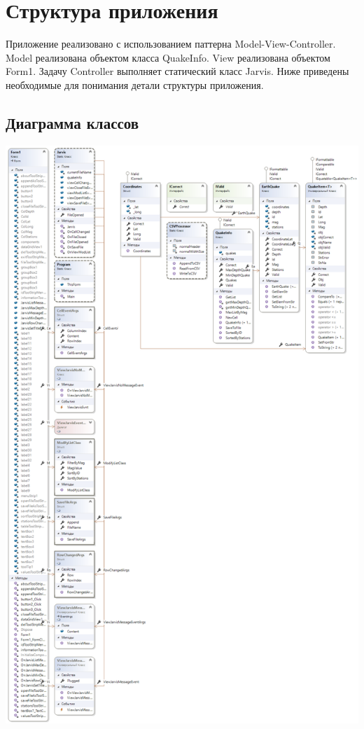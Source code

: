 \documentclass[a4paper,12pt, fleqn]{article}
\theoremstyle{plain} %
\theoremstyle{definition} %
\theoremstyle{remark} %
\numberwithin{equation}{section}
\begin{document}
\section{Структура приложения}
Приложение реализовано с использованием паттерна Model-View-Controller\cite{MVC}. Model реализована объектом класса QuakeInfo. View реализована объектом Form1. Задачу Controller выполняет статический класс Jarvis. Ниже приведены необходимые для понимания детали структуры приложения.
\subsection{Диаграмма классов}
\newpage
\includegraphics[width=1\linewidth]{ClassDiagram4.png}
\end{document}
